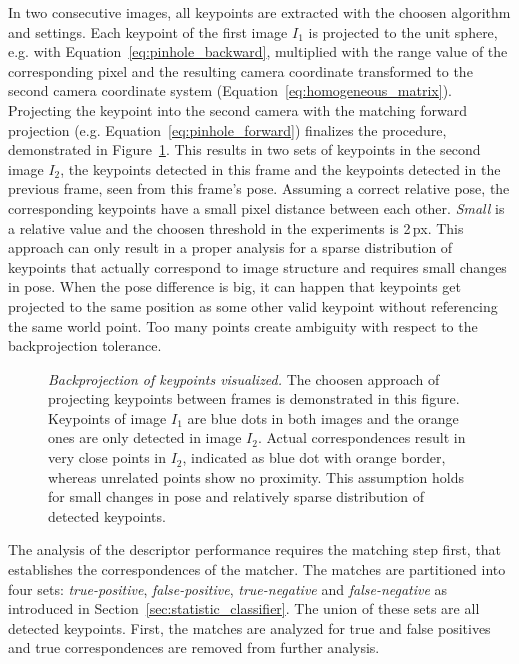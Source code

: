 In two consecutive images, all keypoints are extracted with the choosen algorithm and settings.
Each keypoint of the first image $I_1$ is projected to the unit sphere, e.g. with Equation~\ref{eq:pinhole_backward}, multiplied with the range value of the corresponding pixel and the resulting camera coordinate transformed to the second camera coordinate system (Equation~\ref{eq:homogeneous_matrix}).
Projecting the keypoint into the second camera with the matching forward projection (e.g. Equation~\ref{eq:pinhole_forward}) finalizes the procedure, demonstrated in Figure~\ref{fig:keypoint_projection}.
This results in two sets of keypoints in the second image $I_2$, the keypoints detected in this frame and the keypoints detected in the previous frame, seen from this frame's pose.
Assuming a correct relative pose, the corresponding keypoints have a small pixel distance between each other.
\emph{Small} is a relative value and the choosen threshold in the experiments is 2\,px.
This approach can only result in a proper analysis for a sparse distribution of keypoints that actually correspond to image structure and requires small changes in pose.
When the pose difference is big, it can happen that keypoints get projected to the same position as some other valid keypoint without referencing the same world point.
Too many points create ambiguity with respect to the backprojection tolerance.
\begin{figure}[H]
    
    \caption[Backprojection of keypoints visualized]{\emph{Backprojection of keypoints visualized.} The choosen approach of projecting keypoints between frames is demonstrated in this figure. Keypoints of image $I_1$ are blue dots in both images and the orange ones are only detected in image $I_2$. Actual correspondences result in very close points in $I_2$, indicated as blue dot with orange border, whereas unrelated points show no proximity. This assumption holds for small changes in pose and relatively sparse distribution of detected keypoints.}\label{fig:keypoint_projection}
\end{figure}
\pagebreak[4]
The analysis of the descriptor performance requires the matching step first, that establishes the correspondences of the matcher.
The matches are partitioned into four sets: \emph{true-positive}, \emph{false-positive}, \emph{true-negative} and \emph{false-negative} as introduced in Section~\ref{sec:statistic_classifier}.
The union of these sets are all detected keypoints.
First, the matches are analyzed for true and false positives and true correspondences are removed from further analysis. 
